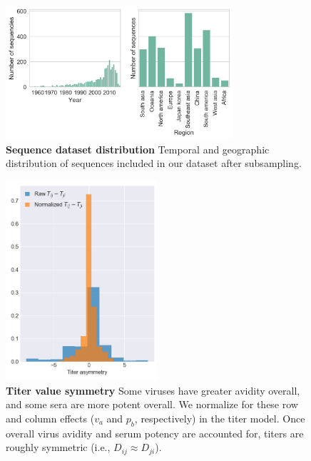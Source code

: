 \documentclass[11pt,oneside,letterpaper]{article}
\begin{document}
\begin{figure}[h]
\centering
	\includegraphics[width=0.75\textwidth]{../figures/png/sequence_distribution.png}
	\caption{\textbf{Sequence dataset distribution}
  Temporal and geographic distribution of sequences included in our dataset after subsampling.
	}
	\label{sequence_distribution}
\end{figure}

\begin{figure}[h]
  \centering
  \includegraphics[width=0.5\textwidth]{../figures/png/titer_asymmetry.png}
  \caption{\textbf{Titer value symmetry}
  Some viruses have greater avidity overall, and some sera are more potent overall.
  We normalize for these row and column effects ($v_a$ and $p_b$, respectively) in the titer model.
  Once overall virus avidity and serum potency are accounted for, titers are roughly symmetric (i.e., $D_{ij} \approx D_{ji}$).
  }
\label{titer_asymmetry}
\end{figure}
\end{document}
